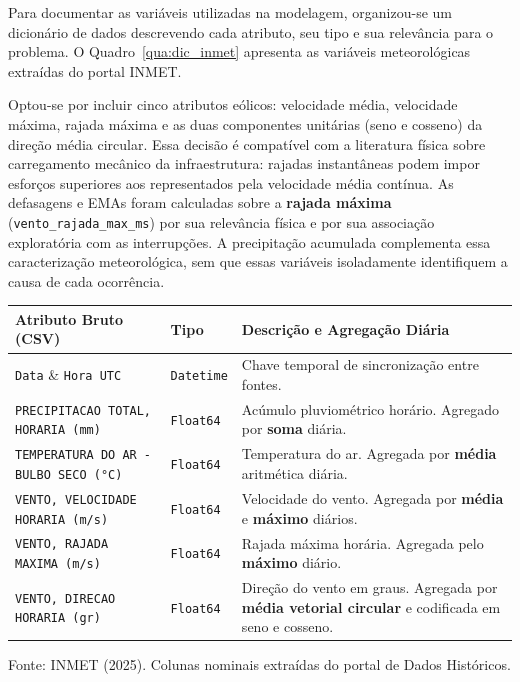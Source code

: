 Para documentar as variáveis utilizadas na modelagem, organizou-se um dicionário de dados descrevendo cada atributo, seu tipo e sua relevância para o problema. O Quadro~\ref{qua:dic_inmet} apresenta as variáveis meteorológicas extraídas do portal INMET.

Optou-se por incluir cinco atributos eólicos: velocidade média, velocidade máxima, rajada máxima e as duas componentes unitárias (seno e cosseno) da direção média circular. Essa decisão é compatível com a literatura física sobre carregamento mecânico da infraestrutura: rajadas instantâneas podem impor esforços superiores aos representados pela velocidade média contínua. As defasagens e EMAs foram calculadas sobre a \textbf{rajada máxima} (\texttt{vento\_rajada\_max\_ms}) por sua relevância física e por sua associação exploratória com as interrupções. A precipitação acumulada complementa essa caracterização meteorológica, sem que essas variáveis isoladamente identifiquem a causa de cada ocorrência.

\begin{quadro}[H]
\caption{Dicionário de Dados Meteorológicos (INMET - Arquivos A001 Históricos)}
\label{qua:dic_inmet}
\begin{center}
\small
\begin{tabular}{p{5.5cm} p{1.8cm} p{6cm}}
\toprule
\textbf{Atributo Bruto (CSV)} & \textbf{Tipo} & \textbf{Descrição e Agregação Diária} \\
\midrule
\texttt{Data} \& \texttt{Hora UTC} & \texttt{Datetime} & Chave temporal de sincronização entre fontes. \\
\texttt{PRECIPITACAO TOTAL, HORARIA (mm)} & \texttt{Float64} & Acúmulo pluviométrico horário. Agregado por \textbf{soma} diária. \\
\texttt{TEMPERATURA DO AR - BULBO SECO (°C)} & \texttt{Float64} & Temperatura do ar. Agregada por \textbf{média} aritmética diária. \\
\texttt{VENTO, VELOCIDADE HORARIA (m/s)} & \texttt{Float64} & Velocidade do vento. Agregada por \textbf{média} e \textbf{máximo} diários. \\
\texttt{VENTO, RAJADA MAXIMA (m/s)} & \texttt{Float64} & Rajada máxima horária. Agregada pelo \textbf{máximo} diário. \\
\texttt{VENTO, DIRECAO HORARIA (gr)} & \texttt{Float64} & Direção do vento em graus. Agregada por \textbf{média vetorial circular} e codificada em seno e cosseno. \\
\bottomrule
\end{tabular}
\normalsize
\end{center}
\small{Fonte: INMET (2025). Colunas nominais extraídas do portal de Dados Históricos.}
\end{quadro}

